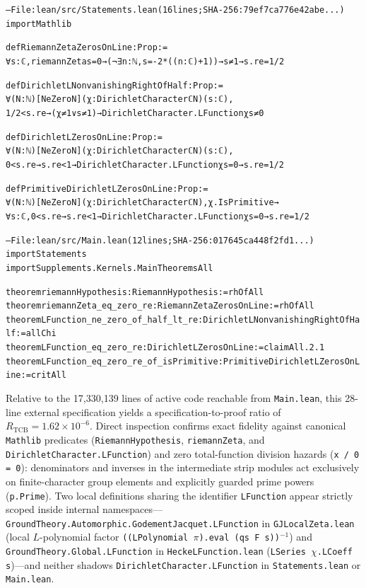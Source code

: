 \documentclass[11pt,a4paper]{article}
\newcommand{\U}[1]{{\leansym #1}}
\newcommand{\code}[1]{\texttt{\small #1}}
\begin{document}
{\scriptsize
\begin{alltt}
-- File: lean/src/Statements.lean (16 lines; SHA-256: 79ef7ca776e42abe...)
import Mathlib

def RiemannZetaZerosOnLine : Prop :=
  \U{∀} s : \U{ℂ}, riemannZeta s = 0 \U{→} (\U{¬}\U{∃} n : \U{ℕ}, s = -2 * ((n : \U{ℂ}) + 1)) \U{→} s \U{≠} 1 \U{→} s.re = 1 / 2

def DirichletLNonvanishingRightOfHalf : Prop :=
  \U{∀} (N : \U{ℕ}) [NeZero N] (χ : DirichletCharacter \U{ℂ} N) (s : \U{ℂ}),
    1 / 2 < s.re \U{→} (χ \U{≠} 1 \U{∨} s \U{≠} 1) \U{→} DirichletCharacter.LFunction χ s \U{≠} 0

def DirichletLZerosOnLine : Prop :=
  \U{∀} (N : \U{ℕ}) [NeZero N] (χ : DirichletCharacter \U{ℂ} N) (s : \U{ℂ}),
    0 < s.re \U{→} s.re < 1 \U{→} DirichletCharacter.LFunction χ s = 0 \U{→} s.re = 1 / 2

def PrimitiveDirichletLZerosOnLine : Prop :=
  \U{∀} (N : \U{ℕ}) [NeZero N] (χ : DirichletCharacter \U{ℂ} N), χ.IsPrimitive \U{→}
    \U{∀} s : \U{ℂ}, 0 < s.re \U{→} s.re < 1 \U{→} DirichletCharacter.LFunction χ s = 0 \U{→} s.re = 1 / 2

-- File: lean/src/Main.lean (12 lines; SHA-256: 017645ca448f2fd1...)
import Statements
import Supplements.Kernels.MainTheoremsAll

theorem riemannHypothesis : RiemannHypothesis := rhOfAll
theorem riemannZeta\_eq\_zero\_re : RiemannZetaZerosOnLine := rhOfAll
theorem LFunction\_ne\_zero\_of\_half\_lt\_re : DirichletLNonvanishingRightOfHalf := allChi
theorem LFunction\_eq\_zero\_re : DirichletLZerosOnLine := claimAll.2.1
theorem LFunction\_eq\_zero\_re\_of\_isPrimitive : PrimitiveDirichletLZerosOnLine := critAll
\end{alltt}
}

Relative to the 17,330,139 lines of active code reachable from \texttt{Main.lean}, this 28-line external specification yields a specification-to-proof ratio of $R_{\mathrm{TCB}} = 1.62 \times 10^{-6}$. Direct inspection confirms exact fidelity against canonical \texttt{Mathlib} predicates (\texttt{RiemannHypothesis}, \texttt{riemannZeta}, and \texttt{DirichletCharacter.LFunction}) and zero total-function division hazards (\texttt{x / 0 = 0}): denominators and inverses in the intermediate strip modules act exclusively on finite-character group elements and explicitly guarded prime powers (\texttt{p.Prime}). Two local definitions sharing the identifier \texttt{LFunction} appear strictly scoped inside internal namespaces---\code{GroundTheory.\allowbreak Automorphic.\allowbreak GodementJacquet.\allowbreak LFunction} in \texttt{GJLocalZeta.lean} (local $L$-polynomial factor \texttt{((LPolynomial $\pi$).eval (qs F s))$^{-1}$}) and \code{GroundTheory.\allowbreak Global.\allowbreak LFunction} in \texttt{HeckeLFunction.lean} (\texttt{LSeries $\chi$.LCoeff s})---and neither shadows \texttt{DirichletCharacter.LFunction} in \texttt{Statements.lean} or \texttt{Main.lean}.
\end{document}
